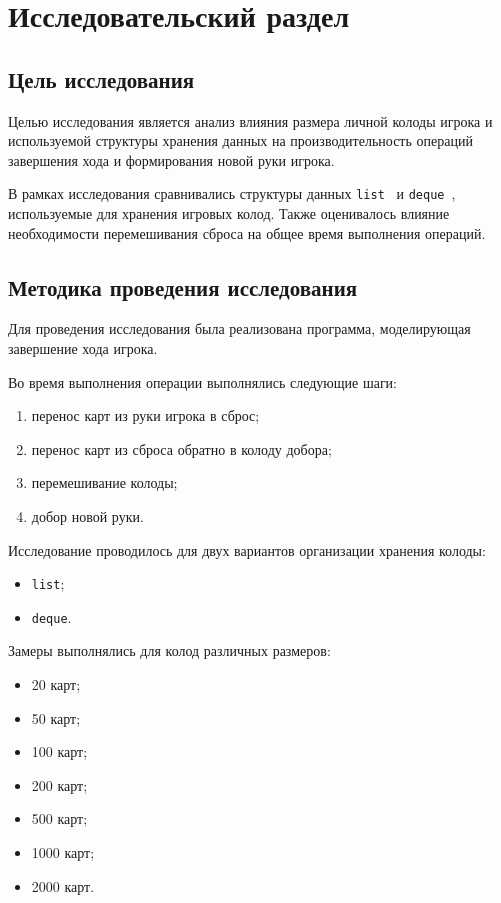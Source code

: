 \chapter{Исследовательский раздел}

\section{Цель исследования}

Целью исследования является анализ влияния размера личной колоды игрока и
используемой структуры хранения данных на производительность операций
завершения хода и формирования новой руки игрока.

В рамках исследования сравнивались структуры данных
\texttt{list}~\cite{py-list} и
\texttt{deque}~\cite{py-deque},
используемые для хранения игровых колод. Также оценивалось влияние
необходимости
перемешивания сброса на общее время выполнения операций.

\section{Методика проведения исследования}

Для проведения исследования была реализована программа, моделирующая завершение
хода игрока.

Во время выполнения операции выполнялись следующие шаги:

\begin{enumerate}
	\item перенос карт из руки игрока в сброс;
	\item перенос карт из сброса обратно в колоду добора;
	\item перемешивание колоды;
	\item добор новой руки.
\end{enumerate}

Исследование проводилось для двух вариантов организации хранения колоды:

\begin{itemize}
	\item \texttt{list};
	\item \texttt{deque}.
\end{itemize}

Замеры выполнялись для колод различных размеров:

\begin{itemize}
	\item 20 карт;
	\item 50 карт;
	\item 100 карт;
	\item 200 карт;
	\item 500 карт;
	\item 1000 карт;
	\item 2000 карт.
\end{itemize}

